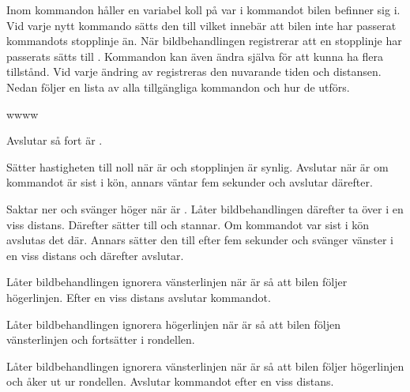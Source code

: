 \documentclass[tekniskrapport/tech.tex]{subfiles}
\begin{document}
\clearpage
Inom kommandon håller en variabel  koll på var i kommandot bilen
befinner sig i. Vid varje nytt kommando sätts den till 
vilket innebär att bilen inte har passerat kommandots stopplinje än. När
bildbehandlingen registrerar att en stopplinje har passerats sätts 
till . Kommandon kan även ändra  själva för att
kunna ha flera tillstånd. Vid varje ändring av  registreras den
nuvarande tiden och distansen. Nedan följer en lista av alla tillgängliga
kommandon och hur de utförs.

\begin{labeling}{wwww}
    \item[\commIgnore] Avslutar så fort  är .
    \item[\commStop] Sätter hastigheten till noll när  är
         och stopplinjen är synlig.  Avslutar när 
        är  om kommandot är sist i kön, annars väntar fem
        sekunder och avslutar därefter.
    \item[\commPark] Saktar ner och svänger höger när  är
        . Låter bildbehandlingen därefter ta över i en viss
        distans. Därefter sätter  till  och stannar. Om
        kommandot var sist i kön avslutas det där. Annars sätter den 
        till  efter fem sekunder och svänger vänster i en viss
        distans och därefter avslutar.
    \item[\commEnter] Låter bildbehandlingen ignorera vänsterlinjen när
         är  så att bilen följer högerlinjen. Efter
        en viss distans avslutar kommandot.
    \item[\commContinue] Låter bildbehandlingen ignorera högerlinjen när
         är  så att bilen följen vänsterlinjen och
        fortsätter i rondellen.
    \item[\commExit] Låter bildbehandlingen ignorera vänsterlinjen när
         är  så att bilen följer högerlinjen och
        åker ut ur rondellen. Avslutar kommandot efter en viss distans.
\end{labeling}
\end{document}
